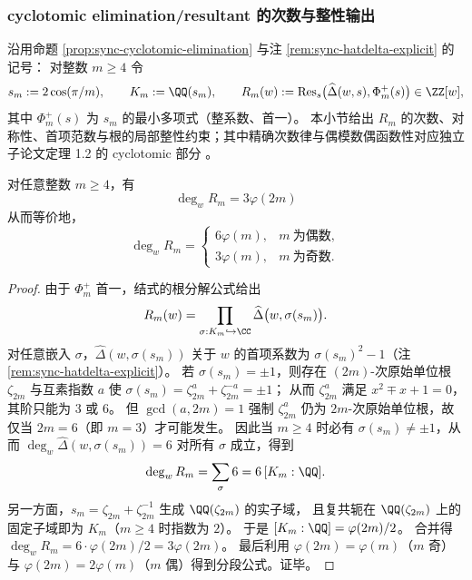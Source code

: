 \subsubsection{cyclotomic elimination/resultant 的次数与整性输出}\label{subsubsec:sync-cyclotomic-elimination-degree-norm-integrality}
沿用命题 \ref{prop:sync-cyclotomic-elimination} 与注 \ref{rem:sync-hatdelta-explicit} 的记号：
对整数 \(m\ge 4\) 令
\[
s_m:=2\cos(\pi/m),\qquad
K_m:=\QQ(s_m),\qquad
R_m(w):=\operatorname{Res}_s\bigl(\widehat\Delta(w,s),\Phi_m^+(s)\bigr)\in\ZZ[w],
\]
其中 \(\Phi_m^+(s)\) 为 \(s_m\) 的最小多项式（整系数、首一）。
本小节给出 \(R_m\) 的次数、对称性、首项范数与根的局部整性约束；其中精确次数律与偶模数偶函数性对应独立子论文定理 1.2 的 cyclotomic 部分
\cite{Internal2026SelfDualSynchronisationKernelCyclotomicTwists}。

\begin{theorem}\label{thm:sync-cyclotomic-elimination-degree-law}
对任意整数 \(m\ge 4\)，有
\[
\boxed{\;\deg_w R_m=3\varphi(2m)\;}
\]
从而等价地，
\[
\deg_w R_m=
\begin{cases}
6\varphi(m),& m\ \text{为偶数},\\
3\varphi(m),& m\ \text{为奇数}.
\end{cases}
\]
\end{theorem}
\begin{proof}
由于 \(\Phi_m^+\) 首一，结式的根分解公式给出
\[
R_m(w)=\prod_{\sigma:K_m\hookrightarrow\CC}\widehat\Delta\bigl(w,\sigma(s_m)\bigr).
\]
对任意嵌入 \(\sigma\)，\(\widehat\Delta(w,\sigma(s_m))\) 关于 \(w\) 的首项系数为 \(\sigma(s_m)^2-1\)（注 \ref{rem:sync-hatdelta-explicit}）。
若 \(\sigma(s_m)=\pm 1\)，则存在 \((2m)\)-次原始单位根 \(\zeta_{2m}\) 与互素指数 \(a\) 使
\(\sigma(s_m)=\zeta_{2m}^a+\zeta_{2m}^{-a}=\pm 1\)；
从而 \(\zeta_{2m}^a\) 满足 \(x^2\mp x+1=0\)，其阶只能为 \(3\) 或 \(6\)。
但 \(\gcd(a,2m)=1\) 强制 \(\zeta_{2m}^a\) 仍为 \(2m\)-次原始单位根，故仅当 \(2m=6\)（即 \(m=3\)）才可能发生。
因此当 \(m\ge 4\) 时必有 \(\sigma(s_m)\neq \pm 1\)，从而 \(\deg_w\widehat\Delta(w,\sigma(s_m))=6\) 对所有 \(\sigma\) 成立，得到
\[
\deg_w R_m=\sum_{\sigma}6=6\,[K_m:\QQ].
\]
另一方面，\(s_m=\zeta_{2m}+\zeta_{2m}^{-1}\) 生成 \(\QQ(\zeta_{2m})\) 的实子域，
且复共轭在 \(\QQ(\zeta_{2m})\) 上的固定子域即为 \(K_m\)（\(m\ge 4\) 时指数为 \(2\)）。
于是
\(
[K_m:\QQ]=\varphi(2m)/2
\)。
合并得 \(\deg_w R_m=6\cdot \varphi(2m)/2=3\varphi(2m)\)。
最后利用 \(\varphi(2m)=\varphi(m)\)（\(m\) 奇）与 \(\varphi(2m)=2\varphi(m)\)（\(m\) 偶）得到分段公式。证毕。
\end{proof}

